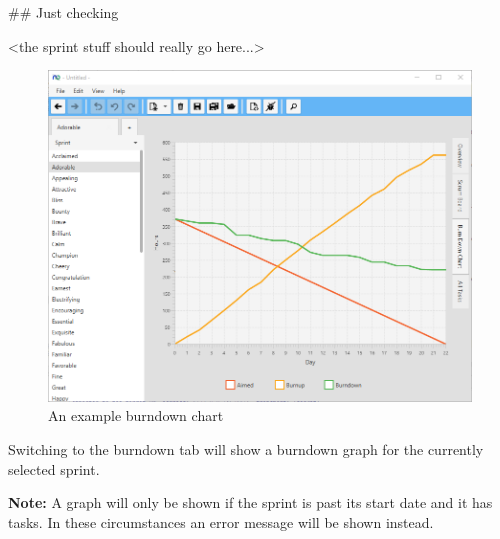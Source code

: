 ##
Just checking





<the sprint stuff should really go here...>









\begin{figure}[H]
\centering
\includegraphics[width=\textwidth]{images/screenshots/burndown.png}
\caption{An example burndown chart}
\label{fig:burndown}
\end{figure}

Switching to the burndown tab will show a burndown graph for the currently selected sprint.

\textbf{Note:}\newline
A graph will only be shown if the sprint is past its start date and it has tasks. In these circumstances an error message will be shown instead.